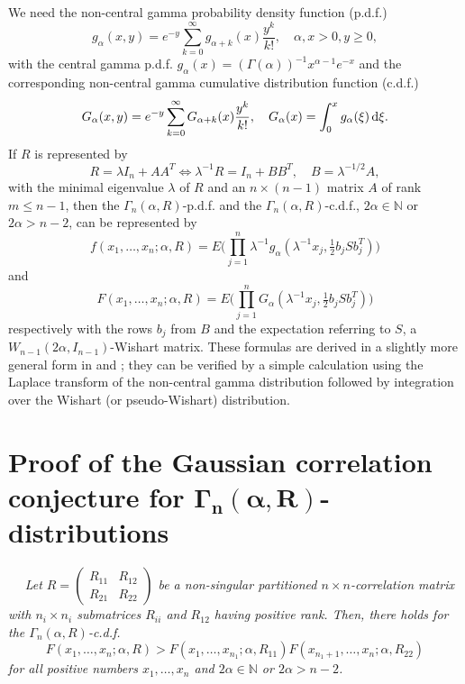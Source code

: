 \documentclass[12pt,twoside]{article}
\numberwithin{equation}{section}
\theoremstyle{plain}
\def\N{\mathbb{N}}
\def\balpha{{\boldsymbol\alpha}}
\def\d{\,{\rm{d}}}
\begin{document}
We need the non-central gamma probability density function (p.d.f.)
\begin{equation}
\label{1.4}
g_\alpha(x,y) = e^{-y} \sum_{k=0}^\infty g_{\alpha+k}(x) \frac{y^k}{k!}, \quad \alpha, x > 0, y \ge 0,
\end{equation}
with the central gamma p.d.f. $g_\alpha(x) = (\Gamma(\alpha))^{-1} x^{\alpha-1} e^{-x}$ and the corresponding non-central gamma cumulative distribution function (c.d.f.)
\begin{equation}
\label{1.5}
G_\alpha(x,y) = e^{-y} \sum_{k=0}^\infty G_{\alpha+k}(x) \frac{y^k}{k!}, \quad 
G_\alpha(x) = \int_0^x g_\alpha(\xi) \d \xi.
\end{equation}
If $R$ is represented by 
\begin{equation}
\label{1.6}
R = \lambda I_n + AA^T \iff \lambda^{-1} R = I_n + BB^T, \quad B = \lambda^{-1/2} A,
\end{equation}
with the minimal eigenvalue $\lambda$ of $R$ and an $n \times (n-1)$ matrix $A$ of rank $m \le n-1$, then the $\Gamma_n(\alpha,R)$-p.d.f. and the $\Gamma_n(\alpha,R)$-c.d.f., $2\alpha \in \N$ or $2\alpha > n-2$, can be represented by 
\begin{equation}
\label{1.7}
f(x_1,\ldots,x_n;\alpha,R) = E\Big(\prod_{j=1}^n \lambda^{-1} g_\alpha(\lambda^{-1} x_j,\tfrac12 b_jSb_j^T)\Big)
\end{equation}
and
\begin{equation}
\label{1.8}
F(x_1,\ldots,x_n;\alpha,R) = E\Big(\prod_{j=1}^n G_\alpha(\lambda^{-1} x_j,\tfrac12 b_jSb_j^T)\Big)
\end{equation}
respectively with the rows $b_j$ from $B$ and the expectation referring to $S$, a $W_{n-1}(2\alpha,I_{n-1})$-Wishart matrix.  These formulas are derived in a slightly more general form in \cite{royen95} and \cite{royen07}; they can be verified by a simple calculation using the Laplace transform of the non-central gamma distribution followed by integration over the Wishart (or pseudo-Wishart) distribution.  



\section{Proof of the Gaussian correlation conjecture for \texorpdfstring{$\mathbf{\Gamma_n(\balpha,R)}$}--distributions}
\label{sec:proof}

 \ \ 
{\it 
Let $R = \begin{pmatrix} R_{11} & R_{12} \\ R_{21} & R_{22}\end{pmatrix}$ be a non-singular partitioned $n \times n$-correlation matrix with $n_i \times n_i$ submatrices $R_{ii}$ and $R_{12}$ having positive rank.  Then, there holds for the $\Gamma_n(\alpha,R)$-c.d.f.
\begin{equation}
\label{2.1}
F(x_1,\ldots,x_n;\alpha,R) > F(x_1,\ldots,x_{n_1};\alpha,R_{11}) F(x_{n_1+1},\ldots,x_n;\alpha,R_{22})
\end{equation}
for all positive numbers $x_1,\ldots,x_n$ and $2\alpha \in \N$ or $2\alpha > n-2$.
}
\end{document}
